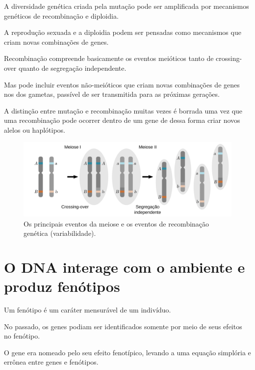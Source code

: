\documentclass[
]{book}
\begin{document}
A diversidade genética criada pela mutação pode ser amplificada por mecanismos genéticos de recombinação e diploidia.

A reprodução sexuada e a diploidia podem ser pensadas como mecanismos que criam novas combinações de genes.

Recombinação compreende basicamente os eventos meióticos tanto de crossing-over quanto de segregação independente.

Mas pode incluir eventos não-meióticos que criam novas combinações de genes nos dos gametas, passível de ser transmitida para as próximas gerações.

A distinção entre mutação e recombinação muitas vezes é borrada uma vez que uma recombinação pode ocorrer dentro de um gene de dessa forma criar novos alelos ou haplótipos.

\begin{figure}

{\centering \includegraphics[width=600px]{figs/chromosome_segregation} 

}

\caption{Os principais eventos da meiose e os eventos de recombinação genética (variabilidade).}\label{fig:meiose}
\end{figure}

\hypertarget{o-dna-interage-com-o-ambiente-e-produz-fenuxf3tipos}{%
\section{O DNA interage com o ambiente e produz fenótipos}\label{o-dna-interage-com-o-ambiente-e-produz-fenuxf3tipos}}

Um fenótipo é um caráter mensurável de um indivíduo.

No passado, os genes podiam ser identificados somente por meio de seus efeitos no fenótipo.

O gene era nomeado pelo seu efeito fenotípico, levando a uma equação simplória e errônea entre genes e fenótipos.
\end{document}
